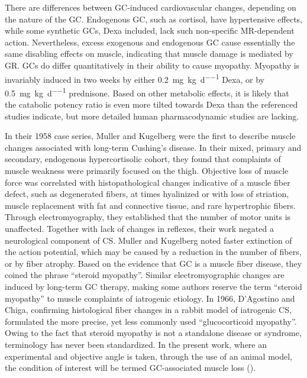 \documentclass[12pt,english]{report}\usepackage[]{graphicx}\usepackage[]{color}
\begin{document}
There are differences between GC-induced cardiovascular changes, depending
on the nature of the GC. Endogenous GC, such as cortisol, have hypertensive
effects, while some synthetic GCs, Dexa included, lack such non-specific
MR-dependent action. Nevertheless, excess exogenous and endogenous
GC cause essentially the same disabling effects on muscle\citep{douglass1992myopathy},
indicating that muscle damage is mediated by GR. GCs do differ quantitatively
in their ability to cause myopathy. Myopathy is invariably induced
in two weeks by either \SI{0.2}{\milli\gram\per\kilo\gram\per\day}
Dexa\citep{batchelor1997steroid}, or by \SI{0.5}{\milli\gram\per\kilo\gram\per\day}
prednisone\citep{bowyer1985steroid}. Based on other metabolic effects,
it is likely that the catabolic potency ratio is even more tilted
towards Dexa than the referenced studies indicate, but more detailed
human pharmacodynamic studies are lacking.

In their 1958 case series, Muller and Kugelberg were the first to
describe muscle changes associated with long-term Cushing's disease\citep{muller1959myopathy}.
In their mixed, primary and secondary, endogenous hypercortisolic
cohort, they found that complaints of muscle weakness were primarily
focused on the thigh. Objective loss of muscle force was correlated
with histopathological changes indicative of a muscle fiber defect,
such as degenerated fibers, at times hyalinized or with loss of striation,
muscle replacement with fat and connective tissue, and rare hypertrophic
fibers. Through electromyography, they established that the number
of motor units is unaffected. Together with lack of changes in reflexes,
their work negated a neurological component of CS. Muller and Kugelberg
noted faster extinction of the action potential, which may be caused
by a reduction in the number of fibers, or by fiber atrophy\citep{rodriguez-carreno2012motor}.
Based on the evidence that GC is a muscle fiber disease, they coined
the phrase ``steroid myopathy''. Similar electromyographic changes
are induced by long-term GC therapy\citep{dropcho1991steroid-induced},
making some authors reserve the term ``steroid myopathy'' to muscle
complaints of iatrogenic etiology. In 1966, D'Agostino and Chiga,
confirming histological fiber changes in a rabbit model of iatrogenic
CS, formulated the more precise, yet less commonly used ``glucocorticoid
myopathy''\citep{dagostino1966cortisone}. Owing to the fact that
steroid myopathy is not a standalone disease or syndrome, terminology
has never been standardized. In the present work, where an experimental
and objective angle is taken, through the use of an animal model,
the condition of interest will be termed GC-associated muscle loss
().
\end{document}
